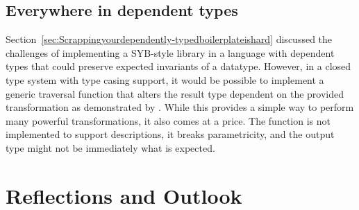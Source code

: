 \documentclass{ituthesis}
\theoremstyle{break}
\begin{document}
\subsection{Everywhere in dependent types}
\label{sub:Everywhere in dependent types}
Section~\ref{sec:Scrappingyourdependently-typedboilerplateishard} discussed the challenges of implementing a SYB-style library in a language with dependent types that could preserve expected invariants of a datatype.
However, in a closed type system with type casing support, it would be possible to implement a generic traversal function that alters the result type dependent on the provided transformation as demonstrated by \textcite{diehl2013every}.
While this provides a simple way to perform many powerful transformations, it also comes at a price.
The function is not implemented to support descriptions, it breaks parametricity, and the output type might not be immediately what is expected.






\section{Reflections and Outlook}
\label{sec:ReflectionsandOutlook}
\end{document}
